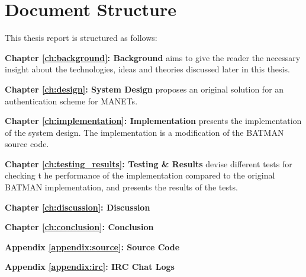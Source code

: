 \section{Document Structure}
This thesis report is structured as follows:

\textbf{Chapter \ref{ch:background}: Background} aims to give the reader the
necessary insight about the technologies, ideas and theories discussed later in
this thesis.

\textbf{Chapter \ref{ch:design}: System Design} proposes an original solution
for an authentication scheme for \acp{MANET}.

\textbf{Chapter \ref{ch:implementation}: Implementation} presents the
implementation of the system design. The implementation is a modification of the
\ac{BATMAN} source code.

\textbf{Chapter \ref{ch:testing_results}: Testing \& Results} devise different
tests for checking t he performance of the implementation compared to the
original \ac{BATMAN} implementation, and presents the results of the tests.

\textbf{Chapter \ref{ch:discussion}: Discussion}

\textbf{Chapter \ref{ch:conclusion}: Conclusion}

\textbf{Appendix \ref{appendix:source}: Source Code}

\textbf{Appendix \ref{appendix:irc}: IRC Chat Logs}